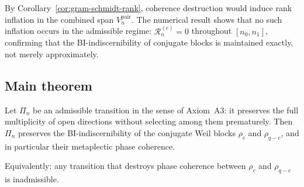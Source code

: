     \begin{remark}
  By Corollary~\ref{cor:gram-schmidt-rank}, coherence destruction would induce
  rank inflation in the combined span $V_n^{\mathrm{pair}}$.
  The numerical result shows that no such inflation occurs in the admissible
  regime: $\mathcal{R}_n^{(c)} = 0$ throughout $[n_0, n_1]$, confirming
  that the BI-indiscernibility of conjugate blocks is maintained exactly,
  not merely approximately.
      \end{remark}

\subsection{Main theorem}
  \label{subsec:q1-theorem}

  \begin{theorem}
    \label{thm:admissibility-phase-coherence}
    Let $\Pi_n$ be an admissible transition in the sense of Axiom~A3:
    it preserves the full multiplicity of open directions without selecting
    among them prematurely.
    Then $\Pi_n$ preserves the BI-indiscernibility of the conjugate Weil blocks
    $\rho_c$ and $\rho_{q-c}$, and in particular their metaplectic phase
    coherence.

    Equivalently: any transition that destroys phase coherence between
    $\rho_c$ and $\rho_{q-c}$ is inadmissible.
  \end{theorem}

